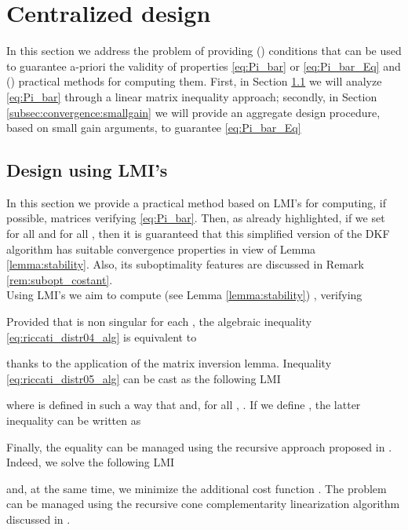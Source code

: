 \documentclass[journal,10pt,draftcls,onecolumn]{IEEEtran}
\begin{document}
\section{Centralized design}
\label{sec:convergence}
In this section we address the problem of providing () conditions that can be used to guarantee a-priori the validity of properties \eqref{eq:Pi_bar} or \eqref{eq:Pi_bar_Eq} and () practical methods for computing them. First, in Section \ref{subsec:convergence:LMI} we will analyze \eqref{eq:Pi_bar} through a linear matrix inequality approach; secondly, in Section \ref{subsec:convergence:smallgain} we will provide an aggregate design procedure, based on small gain arguments, to guarantee \eqref{eq:Pi_bar_Eq}
\subsection{Design using LMI's}
\label{subsec:convergence:LMI}
In this section we provide a practical method based on LMI's for computing, if possible, matrices  verifying \eqref{eq:Pi_bar}. Then, as already highlighted, if we set  for all  and for all , then it is guaranteed that this simplified version of the DKF algorithm has suitable convergence properties in view of Lemma \ref{lemma:stability}. Also, its suboptimality features are discussed in Remark \ref{rem:subopt_costant}.\\
Using LMI's we aim to compute (see Lemma \ref{lemma:stability}) ,  verifying

Provided that  is non singular for each , the algebraic inequality \eqref{eq:riccati_distr04_alg} is equivalent to

thanks to the application of the matrix inversion lemma. Inequality \eqref{eq:riccati_distr05_alg} can be cast as the following LMI

where  is defined in such a way that  and, for all , . If we define , the latter inequality can be written as

Finally, the equality  can be managed using the recursive approach proposed in \cite{ElGhaoui_ConeComplementarity}.
Indeed, we solve the following LMI

and, at the same time, we minimize the additional cost function
.
The problem can be managed using the recursive cone complementarity linearization algorithm discussed in \cite{ElGhaoui_ConeComplementarity}.
\end{document}
